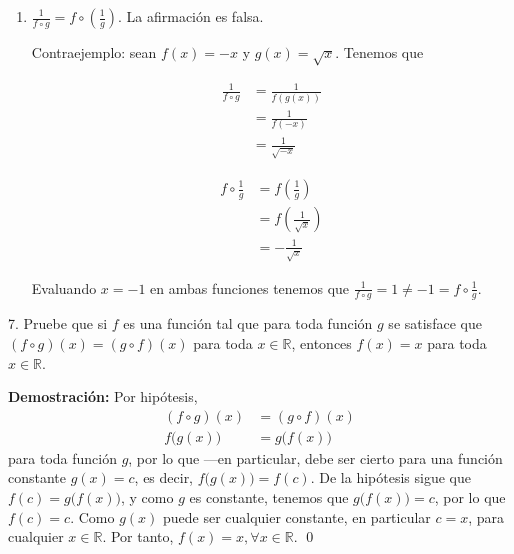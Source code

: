 \documentclass[11pt]{article}
\newcommand{\R}{\mathbb{R}}
\begin{document}
\begin{enumerate}[label=\roman*)]
\pagebreak

  \item $\frac{1}{f\circ g}=f\circ \left(\frac{1}{g}\right)$. La afirmación es falsa.
  
  Contraejemplo: sean $f(x)=-x$ y $g(x)=\sqrt{x}$. Tenemos que 
  \begin{center}
  \noindent\begin{minipage}[r]{.5\linewidth}
  \begin{align*}
  \frac{1}{f\circ g} &= \frac{1}{f(g(x))}\\
  &= \frac{1}{f(-x)}\\
  &= \frac{1}{\sqrt{-x}}
  \end{align*}
  \end{minipage}%
  \begin{minipage}[l]{.5\linewidth}
  \begin{align*}
  f \circ \frac{1}{g} &= f \left(\frac{1}{g}\right)\\
  &= f\left(\frac{1}{\sqrt{x}}\right)\\
  &=-\frac{1}{\sqrt{x}}
  \end{align*}
  \end{minipage}
  \end{center}

  Evaluando $x=-1$ en ambas funciones tenemos que $\frac{1}{f\circ g} = 1 \neq -1 = f \circ \frac{1}{g}$.

\end{enumerate}

7. Pruebe que si $f$ es una función tal que para toda función $g$ se satisface que $(f\circ g)(x)=(g\circ f)(x)$ para toda $x\in \R$, entonces $f(x)=x$ para toda $x\in \R$.

\textbf{Demostración:} Por hipótesis, \begin{align*}
  (f\circ g)(x) &=(g\circ f)(x)\\
  f\bigl(g(x)\bigr) &= g\bigl(f(x)\bigr)
\end{align*} para toda función $g$, por lo que —en particular, debe ser cierto para una función constante $g(x)=c$, es decir, $f\bigl(g(x)\bigr) = f(c)$. De la hipótesis	sigue que $f(c)=g\bigl(f(x)\bigr)$, y como $g$ es constante, tenemos que $g\bigl(f(x)\bigr)=c$, por lo que $f(c)=c$. Como $g(x)$ puede ser cualquier constante, en particular $c=x$, para cualquier $x\in \R$. Por tanto, $f(x)=x, \forall x\in \R$. \qed
\end{document}
